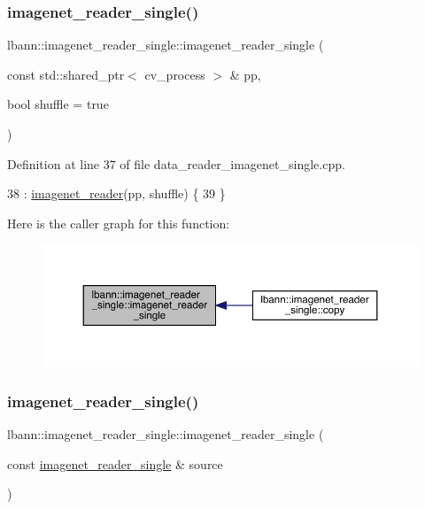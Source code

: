 \subsubsection{\texorpdfstring{imagenet\+\_\+reader\+\_\+single()}{imagenet\_reader\_single()}\hspace{0.1cm}{\footnotesize\ttfamily [1/2]}}
{\footnotesize\ttfamily lbann\+::imagenet\+\_\+reader\+\_\+single\+::imagenet\+\_\+reader\+\_\+single (\begin{DoxyParamCaption}\item[{const std\+::shared\+\_\+ptr$<$ cv\+\_\+process $>$ \&}]{pp,  }\item[{bool}]{shuffle = {\ttfamily true} }\end{DoxyParamCaption})}



Definition at line 37 of file data\+\_\+reader\+\_\+imagenet\+\_\+single.\+cpp.


\begin{DoxyCode}
38   : \hyperlink{classlbann_1_1imagenet__reader_a642331b94cdc3caad8335d65d096141c}{imagenet\_reader}(pp, shuffle) \{
39 \}
\end{DoxyCode}
Here is the caller graph for this function\+:\nopagebreak
\begin{figure}[H]
\begin{center}
\leavevmode
\includegraphics[width=350pt]{classlbann_1_1imagenet__reader__single_ac42ce78ac5d191d571443dfea1f9d2ec_icgraph}
\end{center}
\end{figure}
\mbox{\label{classlbann_1_1imagenet__reader__single_abf3174dec9942137107faf6ef4d24e37}} 
\subsubsection{\texorpdfstring{imagenet\+\_\+reader\+\_\+single()}{imagenet\_reader\_single()}\hspace{0.1cm}{\footnotesize\ttfamily [2/2]}}
{\footnotesize\ttfamily lbann\+::imagenet\+\_\+reader\+\_\+single\+::imagenet\+\_\+reader\+\_\+single (\begin{DoxyParamCaption}\item[{const \hyperlink{classlbann_1_1imagenet__reader__single}{imagenet\+\_\+reader\+\_\+single} \&}]{source }\end{DoxyParamCaption})}



